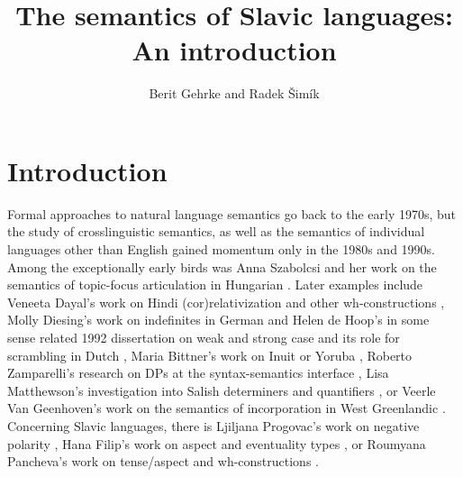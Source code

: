 \documentclass[output=paper,colorlinks,citecolor=brown]{langscibook}
\author{Berit Gehrke\orcid{0000-0002-6315-9532}\affiliation{Humboldt-Universität zu Berlin} and Radek Šimík\orcid{0000-0002-4736-195X}\affiliation{Charles University}}
\title{The semantics of Slavic languages: An introduction}
\begin{document}
\maketitle

\section{Introduction}

Formal approaches to natural language semantics go back to the early 1970s, but the study of crosslinguistic semantics, as well as the semantics of individual languages other than English gained momentum only in the 1980s and 1990s.
Among the exceptionally early birds was Anna Szabolcsi and her work on the semantics of topic-focus articulation in Hungarian \citep{szabolcsi81,szabolcsi83}. Later examples include Veneeta Dayal's work on Hindi (cor)relativization and other wh-constructions \citep{srivastav91a,Dayal1996}, Molly Diesing's work on indefinites in German \citep{diesing92} and Helen de Hoop's in some sense related 1992 dissertation on weak and strong case and its role for scrambling in Dutch \citep[published as][]{dehoop96}, Maria Bittner's work on Inuit or Yoruba \citep{bittner94}, Roberto Zamparelli's research on DPs at the syntax-semantics interface \citep{zamparelli95}, Lisa Matthewson's investigation into Salish determiners and quantifiers \citep{matthewson96}, or Veerle Van Geenhoven's work on the semantics of incorporation in West Greenlandic \citep{geenhoven98}. Concerning Slavic languages, there is Ljiljana Progovac's work on %
negative polarity \citep{Progovac1993a}, Hana Filip's work on %
aspect and eventuality types \citep{filip93,filip96a}, or Roumyana Pancheva's work on tense/aspect \citep{Izvorski1997} and wh-constructions \citep[e.g.,][]{izvorski98}.

\end{document}
